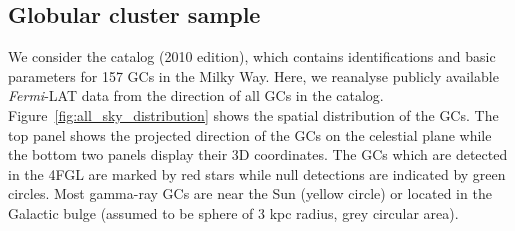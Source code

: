 \documentclass[doublespace,nopageskip]{VTthesis} %
\begin{document}
\subsection{Globular cluster sample}\label{sec:samples}

We consider the \citet{1996AJ....112.1487H} catalog (2010 edition), which contains identifications and basic parameters for 157 GCs in the Milky Way. Here, we reanalyse publicly available {\it Fermi}-LAT data from the direction of all GCs in the \citet{1996AJ....112.1487H} catalog. Figure~\ref{fig:all_sky_distribution} shows the spatial distribution of the GCs. The top panel shows the projected direction of the GCs on the celestial plane while the bottom two panels display their 3D coordinates. The GCs which are detected in the 4FGL are marked by red stars while null detections are indicated by green circles. Most gamma-ray GCs are near the Sun (yellow circle) or located in the Galactic bulge (assumed to be sphere of 3 kpc radius, grey circular area).
\end{document}
